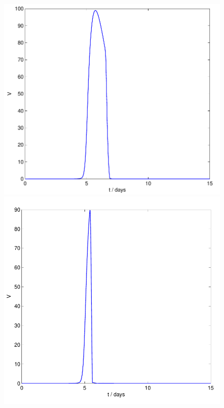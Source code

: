 \documentclass[a4paper, 12pt]{report}
\begin{document}
\newpage
\begin{figure}[h!]
\begin{minipage}{0.5\textwidth}
\includegraphics[height = 0.3\textheight]{drug_t0_6p5_scissored} %
\end{minipage}
\begin{minipage}{0.5\textwidth}
\includegraphics[height = 0.32\textheight]{drug_t0_5p4_scissored} %
\end{minipage}


\end{figure}
\end{document}
